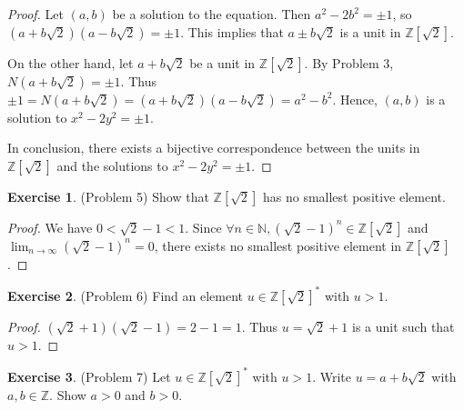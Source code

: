 \documentclass[12pt, psamsfonts]{amsart}
\theoremstyle{definition}
\newtheorem*{exer}{Exercise}
\theoremstyle{remark}
\numberwithin{equation}{section}
\begin{document}
\begin{proof}
  Let $(a, b)$ be a solution to the equation.
  Then $a^2 - 2b^2 = \pm 1$, so $(a + b\sqrt{2})(a - b\sqrt{2}) = \pm 1$.
  This implies that $a \pm b\sqrt{2}$ is a unit in $\mathbb{Z}[\sqrt{2}]$.

  On the other hand, let $a + b\sqrt{2}$ be a unit in $\mathbb{Z}[\sqrt{2}]$.
  By Problem 3, $N(a + b\sqrt{2}) = \pm 1$.
  Thus $\pm 1 = N(a + b\sqrt{2}) = (a + b\sqrt{2})(a - b\sqrt{2}) = a^2 - b^2$.
  Hence, $(a, b)$ is a solution to $x^2 - 2y^2 = \pm 1$.

  In conclusion, there exists a bijective correspondence between the units in $\mathbb{Z}[\sqrt{2}]$ and the solutions to $x^2 - 2y^2 = \pm 1$.
\end{proof}

\begin{exer}{(Problem 5)}
  Show that $\mathbb{Z}[\sqrt{2}]$ has no smallest positive element.
\end{exer}

\begin{proof}
  We have $0 < \sqrt{2} - 1 < 1$.
  Since $\forall n \in \mathbb{N}, (\sqrt{2} - 1)^n \in \mathbb{Z}[\sqrt{2}]$ and $\lim_{n \rightarrow \infty} (\sqrt{2} - 1)^n = 0$, there exists no smallest positive element in $\mathbb{Z}[\sqrt{2}]$.
\end{proof}

\begin{exer}{(Problem 6)}
  Find an element $u \in \mathbb{Z}[\sqrt{2}]^*$ with $u > 1$.
\end{exer}

\begin{proof}
  $(\sqrt{2} + 1)(\sqrt{2} - 1) = 2 - 1 = 1$.
  Thus $u = \sqrt{2} + 1$ is a unit such that $u > 1$.
\end{proof}

\begin{exer}{(Problem 7)}
  Let $u \in \mathbb{Z}[\sqrt{2}]^*$ with $u > 1$.
  Write $u = a + b\sqrt{2}$ with $a, b \in \mathbb{Z}$.
  Show $a > 0$ and $b > 0$.
\end{exer}
\end{document}
